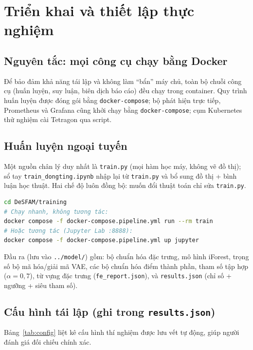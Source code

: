 \section{Triển khai và thiết lập thực nghiệm}
\label{sec:setup}

\subsection{Nguyên tắc: mọi công cụ chạy bằng Docker}
Để bảo đảm khả năng tái lập và không làm ``bẩn'' máy chủ, toàn bộ chuỗi công cụ
(huấn luyện, suy luận, biên dịch báo cáo) đều chạy trong container. Quy trình
huấn luyện được đóng gói bằng \texttt{docker-compose}; bộ phát hiện trực tiếp,
Prometheus và Grafana cũng khởi chạy bằng \texttt{docker-compose}; cụm Kubernetes
thử nghiệm cài Tetragon qua script.

\subsection{Huấn luyện ngoại tuyến}
Một nguồn chân lý duy nhất là \texttt{train.py} (mọi hàm học máy, không vẽ đồ
thị); sổ tay \texttt{train\_dongting.ipynb} nhập lại từ \texttt{train.py} và bổ
sung đồ thị + bình luận học thuật. Hai chế độ luôn đồng bộ: muốn đổi thuật toán
chỉ sửa \texttt{train.py}.

\begin{lstlisting}[language=bash]
cd DeSFAM/training
# Chạy nhanh, không tương tác:
docker compose -f docker-compose.pipeline.yml run --rm train
# Hoặc tương tác (Jupyter Lab :8888):
docker compose -f docker-compose.pipeline.yml up jupyter
\end{lstlisting}

Đầu ra (lưu vào \texttt{../model/}) gồm: bộ chuẩn hóa đặc trưng, mô hình iForest,
trọng số bộ mã hóa/giải mã VAE, các bộ chuẩn hóa điểm thành phần, tham số tập hợp
($\alpha=0{,}7$), từ vựng đặc trưng (\texttt{fe\_report.json}), và
\texttt{results.json} (chỉ số + ngưỡng + siêu tham số).

\subsection{Cấu hình tái lập (ghi trong \texttt{results.json})}
Bảng~\ref{tab:config} liệt kê cấu hình thí nghiệm được lưu vết tự động, giúp người
đánh giá đối chiếu chính xác.


